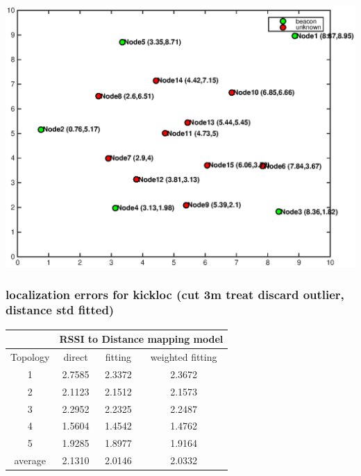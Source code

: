 \documentclass[11pt]{beamer}
\begin{document}
\begin{frame}
\includegraphics[width=\textwidth]{grass_topo1.eps} 
\end{frame}

\begin{frame}
\frametitle{localization errors for kickloc (cut 3m treat discard outlier, distance std fitted)}

\begin{tabular}{|c|c|c|c|}
\hline 
 & \multicolumn{3}{c|}{RSSI to Distance mapping model} \\ 
\hline 
Topology & direct  & fitting & weighted fitting \\ 
\hline
1 & 2.7585 & 2.3372 & 2.3672 \\
\hline
2 & 2.1123 & 2.1512 & 2.1573  \\
\hline
3 & 2.2952 & 2.2325 & 2.2487  \\
\hline
4 & 1.5604 & 1.4542 & 1.4762  \\
\hline
5 & 1.9285 & 1.8977 & 1.9164  \\
\hline
average & 2.1310 & 2.0146 & 2.0332  \\
\hline 
\end{tabular} 
\end{frame}
\end{document}
